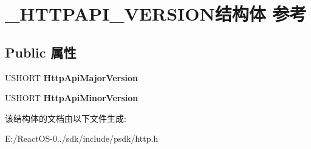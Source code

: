 \hypertarget{struct___h_t_t_p_a_p_i___v_e_r_s_i_o_n}{}\section{\+\_\+\+H\+T\+T\+P\+A\+P\+I\+\_\+\+V\+E\+R\+S\+I\+O\+N结构体 参考}
\label{struct___h_t_t_p_a_p_i___v_e_r_s_i_o_n}
\subsection*{Public 属性}
\begin{DoxyCompactItemize}
\item 
\mbox{\label{struct___h_t_t_p_a_p_i___v_e_r_s_i_o_n_a522a24795db280938c6ba043e210f653}} 
U\+S\+H\+O\+RT {\bfseries Http\+Api\+Major\+Version}
\item 
\mbox{\label{struct___h_t_t_p_a_p_i___v_e_r_s_i_o_n_aa397b9740d91e3cd85fb945401460092}} 
U\+S\+H\+O\+RT {\bfseries Http\+Api\+Minor\+Version}
\end{DoxyCompactItemize}


该结构体的文档由以下文件生成\+:\begin{DoxyCompactItemize}
\item 
E\+:/\+React\+O\+S-\/0../sdk/include/psdk/http.\+h\end{DoxyCompactItemize}
